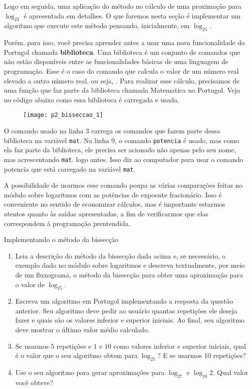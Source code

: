 Logo em seguida, uma aplicação do método no cálculo de uma proximação para $\log_23$ é apresentada em detalhes. O que faremos nesta seção é implementar um algoritmo que execute este método pensando, inicialmente, em $\log_25$.

Porém, para isso, você precisa aprender antes a usar uma nova funcionalidade do Portugol chamada \textbf{biblioteca}. Uma biblioteca é um conjunto de comandos que não estão disponíveis entre as funcionalidades básicas de uma linguagem de programação. Esse é o caso do comando que calcula o valor de um número real elevado a outro número real, ou seja, . Para realizar esse cálculo, precisamos de uma função que faz parte da biblioteca chamada Matematica no Portugol. Veja no código abaixo como essa biblioteca é carregada e usada.

\begin{figure}[H]
\centering

\texttt{[image: p2\_bisseccao\_1]}
\end{figure}

O comando usado na linha 3 carrega os comandos que fazem parte dessa biblioteca na variável \verb|mat|. Na linha 9, o comando \verb|potencia| é usado, mas como ela faz parte da biblioteca, ele precisa ser acionado não apenas pelo seu nome, mas acrescentando \verb|mat|. logo antes. Isso diz ao computador para usar o comando potencia que está carregado na variável \verb|mat|.

\begin{reflection}
A possibilidade de usarmos esse comando poupa as várias comparações feitas no módulo sobre logaritmos com as potências de expoente fracionário. Isso é conveniente no sentido de economizar cálculos, mas é importante estarmos atentos quanto às saídas apresentadas, a fim de verificarmos que elas correspondem à programação prentendida.
\end{reflection}


\begin{task}{Implementando o método da bissecção}
\begin{enumerate}
\item Leia a descrição do método da bissecção dada acima e, se necessário, o exemplo dado no módulo sobre logaritmos e descreva textualmente, por meio de um fluxograma, o método da bissecção para obter uma aproximação para o valor de $\log_25$.

\item Escreva um algoritmo em Portugol implementando a resposta da questão anterior. Seu algoritmo deve pedir ao usuário quantas repetições ele deseja fazer e quais são os valores inferior e superior iniciais. Ao final, seu algoritmo deve mostrar o último valor médio calculado.

\item Se usarmos $5$ repetições e $1$ e $10$ como valores inferior e superior iniciais, qual é o valor que o seu algoritmo obtem para $\log_25$? E se usarmos 10 repetições?

\item Use o seu algoritmo para gerar aproximações para $\log_27$ e $\log_{10}2$. Qual valor você obteve?
\end{enumerate}
\end{task}

